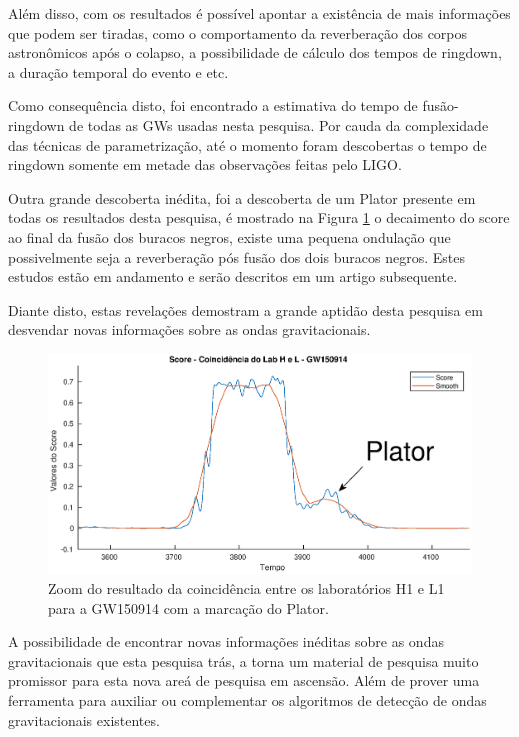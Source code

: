 Além disso, com os resultados é possível apontar a existência de mais informações que podem ser tiradas, como o comportamento da reverberação dos corpos astronômicos após o colapso, a possibilidade de cálculo dos tempos de ringdown, a duração temporal do evento e etc.

Como consequência disto, foi encontrado a estimativa do tempo de fusão-ringdown de todas as GWs usadas nesta pesquisa. Por cauda da complexidade das técnicas de parametrização, até o momento foram descobertas o tempo de ringdown somente em metade das observações feitas pelo LIGO.

Outra grande descoberta inédita, foi a descoberta de um Plator presente em todas os resultados desta pesquisa, é mostrado na Figura \ref{fig:scoreHLPlator} o decaimento do score ao final da fusão dos buracos negros, existe uma pequena ondulação que possivelmente seja a reverberação pós fusão dos dois buracos negros. Estes estudos estão em andamento e serão descritos em um artigo subsequente. 

Diante disto, estas revelações demostram a grande aptidão desta pesquisa em desvendar novas informações sobre as ondas gravitacionais.

\begin{figure}[H]
\centering
\includegraphics[width=1\textwidth]{figuras/GW150914_LabHL_plator.eps}
\caption{Zoom do resultado da coincidência entre os laboratórios H1 e L1 para a GW150914 com a marcação do Plator.}
\label{fig:scoreHLPlator}
\end{figure}

A possibilidade de encontrar novas informações inéditas sobre as ondas gravitacionais que esta pesquisa trás, a torna um material de pesquisa muito promissor para esta nova areá de pesquisa em ascensão. Além de prover uma ferramenta para auxiliar ou complementar os algoritmos de detecção de ondas gravitacionais existentes.

